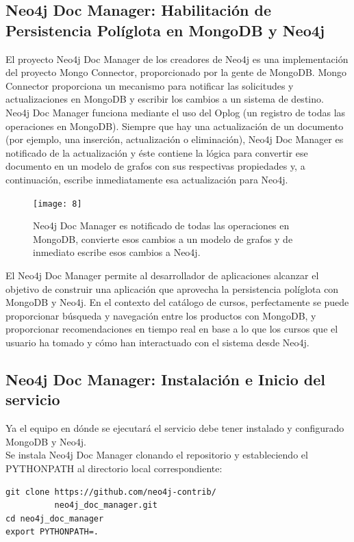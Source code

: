 \documentclass[conference]{IEEEtran}
\begin{document}
\subsection*{Neo4j Doc Manager: Habilitaci\'on de Persistencia Pol\'iglota en MongoDB y Neo4j}

El proyecto Neo4j Doc Manager de los creadores de Neo4j es una implementaci\'on del proyecto Mongo Connector, proporcionado por la gente de MongoDB. Mongo Connector proporciona un mecanismo para notificar las solicitudes y actualizaciones en MongoDB y escribir los cambios a un sistema de destino. Neo4j Doc Manager funciona mediante el uso del Oplog (un registro de todas las operaciones en MongoDB). Siempre que hay una actualizaci\'on de un documento (por ejemplo, una inserci\'on, actualizaci\'on o eliminaci\'on), Neo4j Doc Manager es notificado de la actualizaci\'on y \'este contiene la l\'ogica para convertir ese documento en un modelo de grafos con sus respectivas propiedades y, a continuaci\'on, escribe inmediatamente esa actualizaci\'on para Neo4j.

\begin{figure}[!h]
\centering
\texttt{[image: 8]}
\caption{Neo4j Doc Manager es notificado de todas las operaciones en MongoDB, convierte esos cambios a un modelo de grafos  y de inmediato escribe esos cambios a Neo4j.}
\label{fig8}
\end{figure}

El Neo4j Doc Manager permite al desarrollador de aplicaciones alcanzar el objetivo de construir una aplicaci\'on que aprovecha la persistencia pol\'iglota con MongoDB y Neo4j. En el contexto del cat\'alogo de cursos, perfectamente se puede proporcionar b\'usqueda y navegaci\'on entre los productos con MongoDB, y proporcionar recomendaciones en tiempo real en base a lo que los cursos que el usuario ha tomado y c\'omo han interactuado con el sistema desde Neo4j.

\subsection*{Neo4j Doc Manager: Instalaci\'on e Inicio del servicio}

Ya el equipo en d\'onde se ejecutar\'a el servicio debe tener instalado y configurado MongoDB y Neo4j.\\
Se instala Neo4j Doc Manager clonando el repositorio y estableciendo el PYTHONPATH al directorio local correspondiente:

\begin{lstlisting}
git clone https://github.com/neo4j-contrib/
          neo4j_doc_manager.git
cd neo4j_doc_manager
export PYTHONPATH=.
\end{lstlisting}
\end{document}
